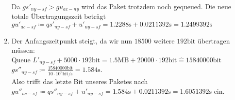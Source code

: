\documentclass[12pt, a4paper]{article}
\begin{document}
\begin{enumerate}[label=\alph*)]
			Da $gs'_{ny-sf} > gu_{ac-ny}$ wird das Paket trotzdem noch gequeued. Die neue totale Übertragungszeit beträgt $gu'_{ac-sf} \coloneqq qs'_{ny-sf} + u'_{ny-sf} = 1.2288 \text{s} + 0.0211392 \text{s} = 1.2499392 \text{s}$
	\item	Der Anfangszeitpunkt steigt, da wir nun $18500$ weitere $192 \text{bit}$ übertragen müssen:\\
			Queue $L'_{ny-sf} + 5000 \cdot 192 \text{bit} = 1.5 \text{MB} + 20000 \cdot 192 \text{bit} \hat{=} 15840000 \text{bit}$
			$gs''_{ny-sf} \coloneqq \frac{15840000 \text{bit}}{10 \cdot 10^6 \text{bit/s}} = 1.584 \text{s}$.\\
			Also trifft das letzte Bit unseres Paketes nach $gu''_{ac-sf} \coloneqq qs''_{ny-sf} + u'_{ny-sf} = 1.584 \text{s} + 0.0211392 \text{s} = 1.6051392 \text{s}$ ein.
\end{enumerate}
\end{document}
